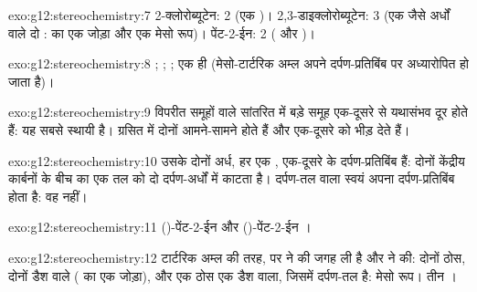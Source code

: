\begin{solution}{exo:g12:stereochemistry:7}
2-क्लोरोब्यूटेन: 2 (एक )। 2,3-डाइक्लोरोब्यूटेन: 3 (एक जैसे अर्धों वाले
दो :  का एक जोड़ा और एक मेसो
रूप)। पेंट-2-ईन: 2 ( और )।
\end{solution}

\begin{solution}{exo:g12:stereochemistry:8}
; ; ; एक ही  (मेसो-टार्टरिक
अम्ल अपने दर्पण-प्रतिबिंब पर अध्यारोपित हो जाता है)।
\end{solution}

\begin{solution}{exo:g12:stereochemistry:9}
विपरीत  समूहों वाले सांतरित  में बड़े
समूह एक-दूसरे से यथासंभव दूर होते हैं: यह सबसे स्थायी है।
ग्रसित  में दोनों  आमने-सामने होते हैं और एक-दूसरे को भीड़ देते हैं।
\end{solution}

\begin{solution}{exo:g12:stereochemistry:10}
उसके दोनों अर्ध, हर एक , एक-दूसरे के दर्पण-प्रतिबिंब हैं:
दोनों केंद्रीय कार्बनों के बीच का एक तल  को दो दर्पण-अर्धों में
काटता है। दर्पण-तल वाला  स्वयं अपना दर्पण-प्रतिबिंब होता है: वह
 नहीं।
\end{solution}

\begin{solution}{exo:g12:stereochemistry:11}
()-पेंट-2-ईन 
और ()-पेंट-2-ईन ।
\end{solution}

\begin{solution}{exo:g12:stereochemistry:12}
टार्टरिक अम्ल की तरह, पर  ने  की जगह ली है और
 ने  की: दोनों  ठोस, दोनों डैश वाले (
का एक जोड़ा), और एक ठोस एक डैश वाला, जिसमें दर्पण-तल है:
मेसो रूप। तीन ।
\end{solution}

